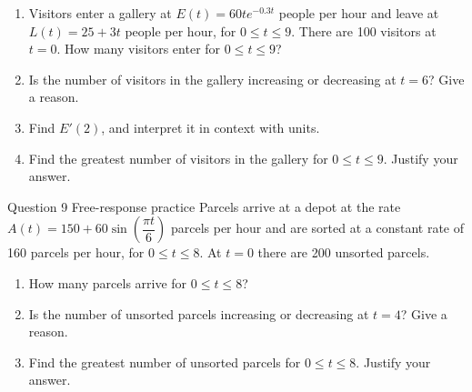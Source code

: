 \documentclass[11pt]{article}
\begin{document}
\begin{enumerate}[leftmargin=*,itemsep=2pt,start=5]
  \item Visitors enter a gallery at $E(t)=60te^{-0.3t}$ people per hour and leave at $L(t)=25+3t$ people per hour, for $0\le t\le9$. There are 100 visitors at $t=0$. How many visitors enter for $0\le t\le9$?\work{2.8cm}
  \item Is the number of visitors in the gallery increasing or decreasing at $t=6$? Give a reason.\work{2.8cm}
  \item Find $E'(2)$, and interpret it in context with units.\work{2.8cm}
  \item Find the greatest number of visitors in the gallery for $0\le t\le9$. Justify your answer.\work{2.8cm}
\end{enumerate}

\begin{frbox}{Question 9 \textperiodcentered{} Free-response practice}
Parcels arrive at a depot at the rate $A(t)=150+60\sin\!\left(\dfrac{\pi t}{6}\right)$ parcels per hour and are sorted at a constant rate of 160 parcels per hour, for $0\le t\le8$. At $t=0$ there are 200 unsorted parcels.
\begin{enumerate}[label=(\alph*),leftmargin=*,itemsep=2pt]
  \item How many parcels arrive for $0\le t\le8$?\work{2.6cm}
  \item Is the number of unsorted parcels increasing or decreasing at $t=4$? Give a reason.\work{2.6cm}
  \item Find the greatest number of unsorted parcels for $0\le t\le8$. Justify your answer.\work{2.6cm}
\end{enumerate}
\end{frbox}
\end{document}
